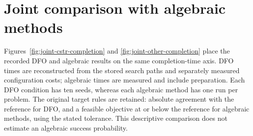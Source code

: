 \clearpage
\section{Joint comparison with algebraic methods}
\label{sec:supp-joint-comparison}
Figures~\ref{fig:joint-cstr-completion} and \ref{fig:joint-other-completion} place the recorded DFO and algebraic results on the same completion-time axis.
DFO times are reconstructed from the stored search paths and separately measured configuration costs; algebraic times are measured and include preparation.
Each DFO condition has ten seeds, whereas each algebraic method has one run per problem.
The original target rules are retained: absolute agreement with the reference for DFO, and a feasible objective at or below the reference for algebraic methods, using the stated tolerance.
This descriptive comparison does not estimate an algebraic success probability.

